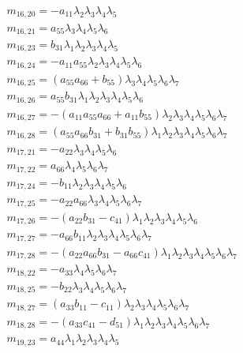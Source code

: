\documentclass{article}
\begin{document}
\begin{align*}
&m_{16,20}=-a_{11} \lambda_{2} \lambda_{3} \lambda_{4} \lambda_{5}\\
&m_{16,21}=a_{55} \lambda_{3} \lambda_{4} \lambda_{5} \lambda_{6}\\
&m_{16,23}=b_{31} \lambda_{1} \lambda_{2} \lambda_{3} \lambda_{4} \lambda_{5}\\
&m_{16,24}=-a_{11} a_{55} \lambda_{2} \lambda_{3} \lambda_{4} \lambda_{5} \lambda_{6}\\
&m_{16,25}={\left(a_{55} a_{66} + b_{55}\right)} \lambda_{3} \lambda_{4} \lambda_{5} \lambda_{6} \lambda_{7}\\
&m_{16,26}=a_{55} b_{31} \lambda_{1} \lambda_{2} \lambda_{3} \lambda_{4} \lambda_{5} \lambda_{6}\\
&m_{16,27}=-{\left(a_{11} a_{55} a_{66} + a_{11} b_{55}\right)} \lambda_{2} \lambda_{3} \lambda_{4} \lambda_{5} \lambda_{6} \lambda_{7}\\
&m_{16,28}={\left(a_{55} a_{66} b_{31} + b_{31} b_{55}\right)} \lambda_{1} \lambda_{2} \lambda_{3} \lambda_{4} \lambda_{5} \lambda_{6} \lambda_{7}\\
&m_{17,21}=-a_{22} \lambda_{3} \lambda_{4} \lambda_{5} \lambda_{6}\\
&m_{17,22}=a_{66} \lambda_{4} \lambda_{5} \lambda_{6} \lambda_{7}\\
&m_{17,24}=-b_{11} \lambda_{2} \lambda_{3} \lambda_{4} \lambda_{5} \lambda_{6}\\
&m_{17,25}=-a_{22} a_{66} \lambda_{3} \lambda_{4} \lambda_{5} \lambda_{6} \lambda_{7}\\
&m_{17,26}=-{\left(a_{22} b_{31} - c_{41}\right)} \lambda_{1} \lambda_{2} \lambda_{3} \lambda_{4} \lambda_{5} \lambda_{6}\\
&m_{17,27}=-a_{66} b_{11} \lambda_{2} \lambda_{3} \lambda_{4} \lambda_{5} \lambda_{6} \lambda_{7}\\
&m_{17,28}=-{\left(a_{22} a_{66} b_{31} - a_{66} c_{41}\right)} \lambda_{1} \lambda_{2} \lambda_{3} \lambda_{4} \lambda_{5} \lambda_{6} \lambda_{7}\\
&m_{18,22}=-a_{33} \lambda_{4} \lambda_{5} \lambda_{6} \lambda_{7}\\
&m_{18,25}=-b_{22} \lambda_{3} \lambda_{4} \lambda_{5} \lambda_{6} \lambda_{7}\\
&m_{18,27}={\left(a_{33} b_{11} - c_{11}\right)} \lambda_{2} \lambda_{3} \lambda_{4} \lambda_{5} \lambda_{6} \lambda_{7}\\
&m_{18,28}=-{\left(a_{33} c_{41} - d_{51}\right)} \lambda_{1} \lambda_{2} \lambda_{3} \lambda_{4} \lambda_{5} \lambda_{6} \lambda_{7}\\
&m_{19,23}=a_{44} \lambda_{1} \lambda_{2} \lambda_{3} \lambda_{4} \lambda_{5}\\
\end{align*}
\end{document}
